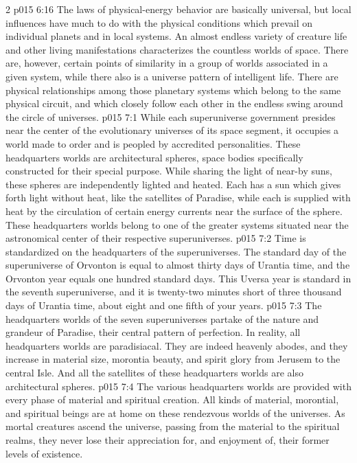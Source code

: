 \begin{multicols}{2}
\vs p015 6:16 The laws of physical\hyp{}energy behavior are basically universal, but local influences have much to do with the physical conditions which prevail on individual planets and in local systems. An almost endless variety of creature life and other living manifestations characterizes the countless worlds of space. There are, however, certain points of similarity in a group of worlds associated in a given system, while there also is a universe pattern of intelligent life. There are physical relationships among those planetary systems which belong to the same physical circuit, and which closely follow each other in the endless swing around the circle of universes.
\vs p015 7:1 While each superuniverse government presides near the center of the evolutionary universes of its space segment, it occupies a world made to order and is peopled by accredited personalities. These headquarters worlds are architectural spheres, space bodies specifically constructed for their special purpose. While sharing the light of near\hyp{}by suns, these spheres are independently lighted and heated. Each has a sun which gives forth light without heat, like the satellites of Paradise, while each is supplied with heat by the circulation of certain energy currents near the surface of the sphere. These headquarters worlds belong to one of the greater systems situated near the astronomical center of their respective superuniverses.
\pc \vs p015 7:2 Time is standardized on the headquarters of the superuniverses. The standard day of the superuniverse of Orvonton is equal to almost thirty days of Urantia time, and the Orvonton year equals one hundred standard days. This Uversa year is standard in the seventh superuniverse, and it is twenty\hyp{}two minutes short of three thousand days of Urantia time, about eight and one fifth of your years.
\pc \vs p015 7:3 The headquarters worlds of the seven superuniverses partake of the nature and grandeur of Paradise, their central pattern of perfection. In reality, all headquarters worlds are paradisiacal. They are indeed heavenly abodes, and they increase in material size, morontia beauty, and spirit glory from Jerusem to the central Isle. And all the satellites of these headquarters worlds are also architectural spheres.
\vs p015 7:4 The various headquarters worlds are provided with every phase of material and spiritual creation. All kinds of material, morontial, and spiritual beings are at home on these rendezvous worlds of the universes. As mortal creatures ascend the universe, passing from the material to the spiritual realms, they never lose their appreciation for, and enjoyment of, their former levels of existence.

\end{multicols}
